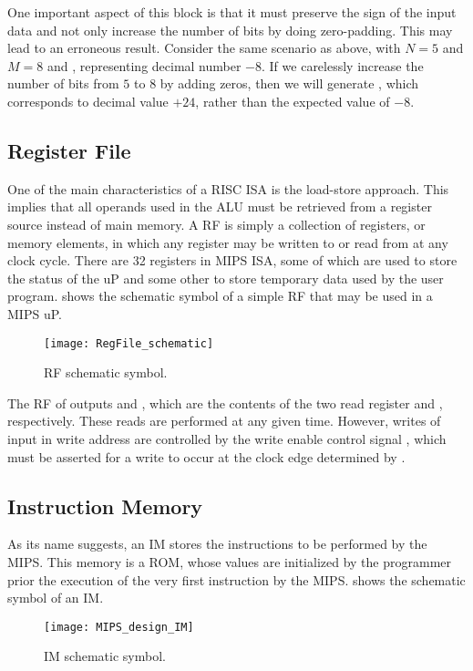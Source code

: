 \documentclass[number=03]{assignment}
\begin{document}
One important aspect of this block is that it must preserve the sign of the input data and not only increase the number of bits by doing zero-padding. 
This may lead to an erroneous result.
Consider the same scenario as above, with $N=5$ and $M=8$ and , representing decimal number $-8$.
If we carelessly increase the number of bits from $5$ to $8$ by adding zeros, then we will generate , which corresponds to decimal value $+24$, rather than the expected value of $-8$.

\subsection{Register File}
One of the main characteristics of a \ac{RISC} \ac{ISA} is the load-store approach. 
This implies that all operands used in the \ac{ALU} must be retrieved from a register source instead of main memory.
A \ac{RF} is simply a collection of registers, or memory elements, in which any register may be written to or read from at any clock cycle.
There are 32 registers in \ac{MIPS} \ac{ISA}, some of which are used to store the status of the \ac{uP} and some other to store temporary data used by the user program.
 shows the schematic symbol of a simple \ac{RF} that may be used in a \ac{MIPS} \ac{uP}.
%
\begin{figure}[!ht]
\centering
\texttt{[image: RegFile\_schematic]}
\caption{\ac{RF} schematic symbol.}
\label{Figure:RF_schematic}
\end{figure}
%

The \ac{RF} of  outputs  and , which are the contents of the two read register  and , respectively. 
These reads are performed at any given time.
However, writes of input  in write address  are controlled by the write enable control signal , which must be asserted for a write to occur at the clock edge determined by .

\subsection{Instruction Memory}
As its name suggests, an \ac{IM} stores the instructions to be performed by the \ac{MIPS}. 
This memory is a \ac{ROM}, whose values are initialized by the programmer prior the execution of the very first instruction by the \ac{MIPS}. 
 shows the schematic symbol of an \ac{IM}.
%
\begin{figure}[!ht]
\centering
\texttt{[image: MIPS\_design\_IM]}
\caption{\ac{IM} schematic symbol.}
\label{Figure:IM}
\end{figure}
%
\end{document}
